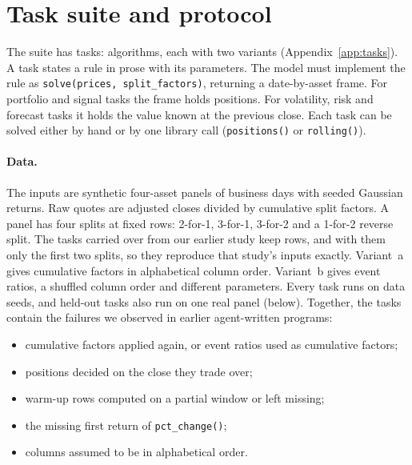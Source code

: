 \section{Task suite and protocol}
\label{sec:tasks}

The suite has \NTasks{} tasks: \NTaskAlgorithms{} algorithms, each with two variants
(Appendix~\ref{app:tasks}). A task states a rule in prose with its parameters. The model
must implement the rule as \texttt{solve(prices, split\_factors)}, returning a date-by-asset
frame. For portfolio and signal tasks the frame holds positions. For volatility, risk and
forecast tasks it holds the value known at the previous close. Each task can be solved
either by hand or by one library call (\texttt{positions()} or \texttt{rolling()}).

\paragraph{Data.}
The inputs are synthetic four-asset panels of \NRows{} business days with seeded Gaussian
returns. Raw quotes are adjusted closes divided by cumulative split factors. A panel has four
splits at fixed rows: 2-for-1, 3-for-1, 3-for-2 and a 1-for-2 reverse split. The
\NEFourTasks{} tasks carried over from our earlier study keep \NRowsEFour{} rows, and with them
only the first two splits, so they reproduce that study's inputs exactly. Variant~a gives cumulative factors in alphabetical column order.
Variant~b gives event ratios, a shuffled column order and different parameters. Every task
runs on \NSeeds{} data seeds, and held-out tasks also run on one real
panel (below). Together, the tasks contain the failures we observed in earlier
agent-written programs:
\begin{itemize}
\item cumulative factors applied again, or event ratios used as cumulative factors;
\item positions decided on the close they trade over;
\item warm-up rows computed on a partial window or left missing;
\item the missing first return of \texttt{pct\_change()};
\item columns assumed to be in alphabetical order.
\end{itemize}

